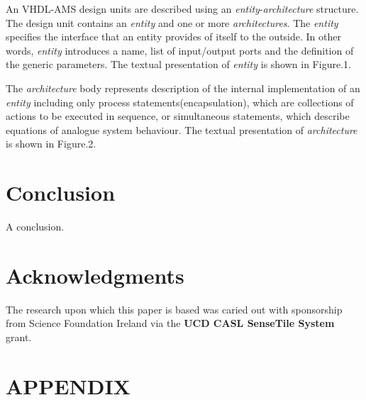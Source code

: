 \documentclass{article}
\newcommand{\ent}{\emph{entity}\xspace}
\newcommand{\arch}{\emph{architecture}\xspace}
\newcommand{\archs}{\emph{architectures}\xspace}
\begin{document}
An VHDL-AMS design units are described using an \ent-\arch structure. 
The design unit contains an \ent and one or more \archs. 
The \ent specifies the interface that an entity provides of itself 
to the outside. In other words, \ent introduces a name, list of 
input/output ports and the definition of the generic parameters. 
The textual presentation of \ent is shown in Figure.1. 

 
The \arch body represents description of the internal implementation 
of an \ent including only process statements(encapsulation), which 
are collections  of actions to be executed in sequence, or simultaneous statements, 
which describe equations of analogue system behaviour. 
The textual presentation of \arch is shown in Figure.2.


\section{Conclusion}

A conclusion.

\section {Acknowledgments}
The research upon which this paper is based was caried out with
sponsorship from Science Foundation Ireland via the 
\textbf{UCD CASL SenseTile System} grant.






\appendix
\newpage
\section {APPENDIX}
























\end{document}
